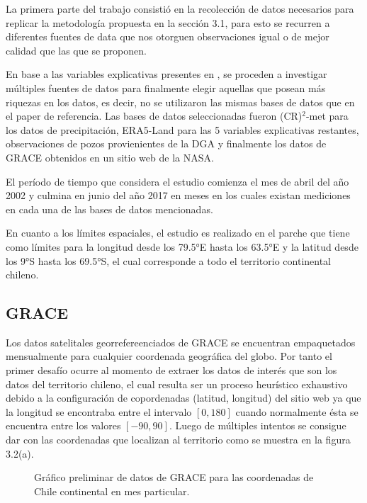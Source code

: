 La primera parte del trabajo consistió en la recolección de datos necesarios para replicar la metodología
propuesta en la sección 3.1, para esto se recurren a diferentes fuentes de data que nos otorguen observaciones igual
o de mejor calidad que las que se proponen.

En base a las variables explicativas presentes en \cite{11}, se proceden a investigar múltiples fuentes de datos para finalmente
elegir aquellas que posean más riquezas en los datos, es decir, no se utilizaron las mismas bases de datos que en el paper de referencia. 
Las bases de datos seleccionadas fueron (CR)$^2$-met para los datos de precipitación, ERA5-Land para las 5 variables explicativas restantes,
observaciones de pozos provienientes de la DGA y finalmente los datos de GRACE obtenidos en un sitio web de la NASA.

El período de tiempo que considera el estudio comienza el mes de abril del año 2002 y culmina en junio del año 2017 en meses en los cuales existan mediciones en cada una
de las bases de datos mencionadas.

En cuanto a los límites espaciales, el estudio es realizado en el parche que tiene como límites para la longitud desde los 79.5°E hasta los 63.5°E y la latitud desde los 9°S hasta los
69.5°S, el cual corresponde a todo el territorio continental chileno.

    \subsection{GRACE}
    Los datos satelitales georrefereenciados de GRACE se encuentran empaquetados mensualmente
    para cualquier coordenada geográfica del globo. Por tanto el primer desafío ocurre al momento de extraer los datos de interés que son los datos 
    del territorio chileno, el cual resulta ser un proceso heurístico exhaustivo debido a la configuración de copordenadas (latitud, longitud) del sitio web
    ya que la longitud se encontraba entre el intervalo $[0,180]$ cuando normalmente ésta se encuentra entre los valores $[-90,90]$. Luego de múltiples intentos
    se consigue dar con las coordenadas que localizan al territorio como se muestra en la figura 3.2(a).
    
    \begin{figure}[ht]
        \centering
              \goodgap
              \vskip -0.1in
        \caption[Rutina para extracción de datos GRACE]{Gráfico preliminar de datos de GRACE para las coordenadas de Chile continental en mes particular.}
        \label{logo}
    \end{figure}

